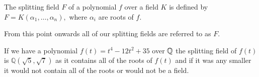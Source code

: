 \begin{definition}
    The splitting field $F$ of a polynomial $f$ over a field $K$ is defined by $F = K(\alpha_1, \ldots, \alpha_n), $ where $\alpha_i$ are roots of $f$. 
\end{definition}

From this point onwards all of our splitting fields are referred to as $F$.

\begin{example}
	If we have a polynomial \(f(t) = t^4 - 12t^2 + 35\) over $\mathbb Q$ the splitting field of \(f(t)\) is \(\mathbb{Q}(\sqrt{5},\sqrt{7})\) as it contains all of the roots of \(f(t)\) and if it was any smaller it would not contain all of the roots or would not be a field.
\end{example}

